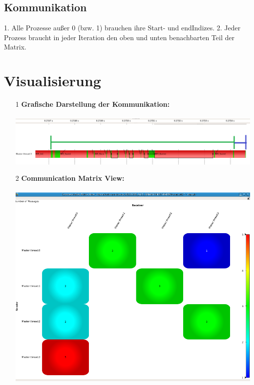 \documentclass[a4paper,10pt]{article}
\begin{document}
\subsection*{Kommunikation}
1. Alle Prozesse außer 0 (bzw. 1) brauchen ihre Start- und endIndizes.
2. Jeder Prozess braucht in jeder Iteration den oben und unten benachbarten Teil der Matrix.

\section{Visualisierung}
\begin{itemize}
    \item[1] \textbf{Grafische Darstellung der Kommunikation:}\\\\
    \includegraphics[width=16cm]{GrafikKommunikation.png}
    \item[2] \textbf{Communication Matrix View:}\\\\
    \includegraphics[width=14cm]{CommunicationMatrixView1.png}\\

\end{itemize}
\end{document}

